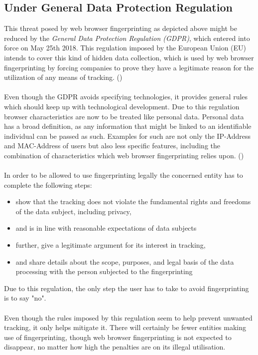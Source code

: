 \subsection{Under General Data Protection Regulation}
This threat posed by web browser fingerprinting as depicted above might be reduced by the \textit{General Data Protection Regulation (GDPR)}, which entered into force on May 25th 2018. This regulation imposed by the European Union (EU) intends to cover this kind of hidden data collection, which is used by web browser fingerprinting by forcing companies to prove they have a legitimate reason for the utilization of any means of tracking. (\textcite{miele18})\\\\
Even though the GDPR avoids specifying technologies, it provides general rules which should keep up with technological development. Due to this regulation browser characteristics are now to be treated like personal data. Personal data has a broad definition, as any information that might be linked to an identifiable individual can be passed as such. Examples for such are not only the IP-Address and MAC-Address of users but also less specific features, including the combination of characteristics which web browser fingerprinting relies upon. (\textcite{miele18})\\\\
In order to be allowed to use fingerprinting legally the concerned entity has to complete the following steps:
\begin{itemize}
	\item show that the tracking does not violate the fundamental rights and freedoms of the data subject, including privacy, 
	\item and is in line with reasonable expectations of data subjects
	\item further, give a legitimate argument for its interest in tracking,
	\item and share details about the scope, purposes, and legal basis of the data processing with the person subjected to the fingerprinting
\end{itemize}
Due to this regulation, the only step the user has to take to avoid fingerprinting is to say "no".\\\\
Even though the rules imposed by this regulation seem to help prevent unwanted tracking, it only helps mitigate it. There will certainly be fewer entities making use of fingerprinting, though web browser fingerprinting is not expected to disappear, no matter how high the penalties are on its illegal utilisation.\\\\
